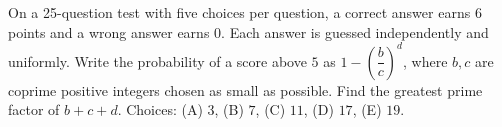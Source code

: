 On a 25-question test with five choices per question, a correct answer earns $6$ points and a wrong answer earns $0$. Each answer is guessed independently and uniformly. Write the probability of a score above $5$ as $1-\left(\dfrac{b}{c}\right)^d$, where $b,c$ are coprime positive integers chosen as small as possible. Find the greatest prime factor of $b+c+d$. Choices: (A) $3$, (B) $7$, (C) $11$, (D) $17$, (E) $19$.
